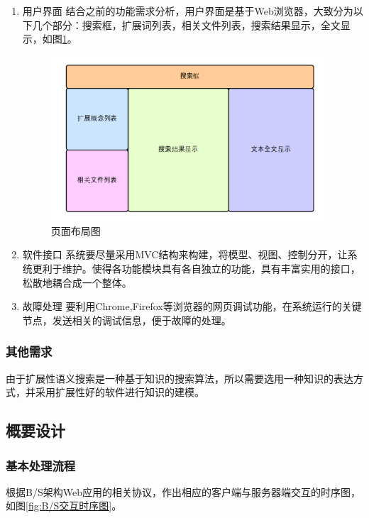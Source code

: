 \documentclass[12pt,a4paper]{article}
\newcommand{\wuhao}{\fontsize{10.5pt}{\baselineskip}\selectfont}
\begin{document}
\begin{enumerate}[(1)]
\item 用户界面
	结合之前的功能需求分析，用户界面是基于Web浏览器，大致分为以下几个部分：搜索框，扩展词列表，相关文件列表，搜索结果显示，全文显示，如图\ref{fig:页面布局图}。

	\begin{figure}[htbp] 
	\centering\includegraphics[width=4in]{fig/WindowsDistribution.png} 
	\caption{\wuhao 页面布局图}\label{fig:页面布局图}
	\end{figure} 

\item 软件接口
	系统要尽量采用{\Times MVC}结构来构建，将模型、视图、控制分开，让系统更利于维护。使得各功能模块具有各自独立的功能，具有丰富实用的接口，松散地耦合成一个整体。

\item 故障处理
	要利用{\Times Chrome},{\Times Firefox}等浏览器的网页调试功能，在系统运行的关键节点，发送相关的调试信息，便于故障的处理。
	
\end{enumerate}		
		
		\subsubsection{其他需求}
	由于扩展性语义搜索是一种基于知识的搜索算法，所以需要选用一种知识的表达方式，并采用扩展性好的软件进行知识的建模。
	
	\subsection{概要设计}
		\subsubsection{基本处理流程}
	
	根据{\Times B/S}架构{\Times Web}应用的相关协议，作出相应的客户端与服务器端交互的时序图，如图\ref{fig:B/S交互时序图}。
	
\end{document}
